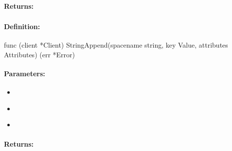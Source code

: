 \paragraph{Returns:}


\pagebreak
\subsubsection{}
\label{api:Go:StringAppend}


\paragraph{Definition:}
\begin{gocode}
func (client *Client) StringAppend(spacename string, key Value, attributes Attributes) (err *Error)
\end{gocode}

\paragraph{Parameters:}
\begin{itemize}[noitemsep]
\item {}\\

\item {}\\

\item {}\\

\end{itemize}

\paragraph{Returns:}


\pagebreak
\subsubsection{}
\label{api:Go:UxactStringAppend}


